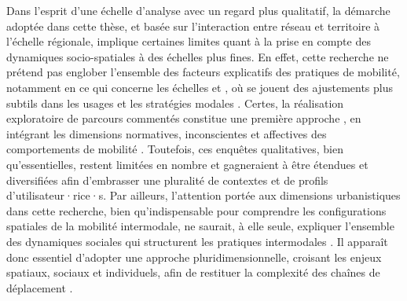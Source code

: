 \begin{refsegment}
Dans l'esprit d'une échelle d'analyse  avec un regard plus qualitatif, la démarche  adoptée dans cette thèse, et basée sur l’interaction entre réseau et territoire à l’échelle régionale, implique certaines limites quant à la prise en compte des dynamiques socio-spatiales à des échelles plus fines. En effet, cette recherche ne prétend pas englober l’ensemble des facteurs explicatifs des pratiques de mobilité, notamment en ce qui concerne les échelles  et , où se jouent des ajustements plus subtils dans les usages et les stratégies modales \textcolor{blue}{\autocite[7]{desjeux_sciences_2004}}. Certes, la réalisation exploratoire de parcours commentés constitue une première approche , en intégrant les dimensions normatives, inconscientes et affectives des comportements de mobilité \textcolor{blue}{\autocite[7]{desjeux_sciences_2004}}. Toutefois, ces enquêtes qualitatives, bien qu’essentielles, restent limitées en nombre et gagneraient à être étendues et diversifiées afin d’embrasser une pluralité de contextes et de profils d’utilisateur·rice·s. Par ailleurs, l’attention portée aux dimensions urbanistiques dans cette recherche, bien qu’indispensable pour comprendre les configurations spatiales de la mobilité intermodale, ne saurait, à elle seule, expliquer l’ensemble des dynamiques sociales qui structurent les pratiques intermodales \textcolor{blue}{\autocite[4]{gaudron-arlon_gender_2022}}. Il apparaît donc essentiel d’adopter une approche pluridimensionnelle, croisant les enjeux spatiaux, sociaux et individuels, afin de restituer la complexité des chaînes de déplacement \textcolor{blue}{\autocite[7]{heesch_gender_2012}}.%


\end{refsegment}
